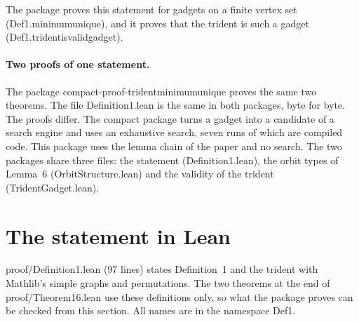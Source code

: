 \documentclass[11pt,a4paper]{article}
\newcommand{\leanus}{\textunderscore\allowbreak}
\newcommand{\lean}[1]{{\ttfamily\let\_\leanus #1}}
\begin{document}
\medskip
The package proves this statement for gadgets on a finite vertex set
(\lean{Def1.minimum\_unique}), and it proves that the trident is such a
gadget (\lean{Def1.trident\_is\_valid\_gadget}).

\paragraph{Two proofs of one statement.} The package
\lean{compact-proof-trident\_minimum\_unique} proves the same two theorems.
The file \lean{Definition1.lean} is the same in both packages, byte for byte.
The proofs differ. The compact package turns a gadget into a candidate of a
search engine and uses an exhaustive search, seven runs of which are
compiled code. This package uses the lemma chain of the paper and no search.
The two packages share three files: the statement
(\lean{Definition1.lean}), the orbit types of Lemma~6
(\lean{OrbitStructure.lean}) and the validity of the trident
(\lean{TridentGadget.lean}).

\section{The statement in Lean}\label{sec:statement}

\lean{proof/Definition1.lean} (97 lines) states Definition~1 and the trident
with Mathlib's simple graphs and permutations. The two theorems at the end of
\lean{proof/Theorem16.lean} use these definitions only, so what the package
proves can be checked from this section. All names are in the namespace
\lean{Def1}.
\end{document}
